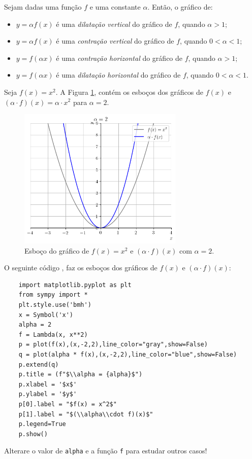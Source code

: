 Sejam dadas uma função $f$ e uma constante $\alpha$. Então, o gráfico de:
\begin{itemize}
\item $y = \alpha f(x)$ é uma \emph{dilatação vertical} do gráfico de $f$, quando $\alpha > 1$;
\item $y = \alpha f(x)$ é uma \emph{contração vertical} do gráfico de $f$, quando $0<\alpha < 1$;
\item $y = f(\alpha x)$ é uma \emph{contração horizontal} do gráfico de $f$, quando $\alpha > 1$;
\item $y = f(\alpha x)$ é uma \emph{dilatação horizontal} do gráfico de $f$, quando $0<\alpha < 1$.
\end{itemize}

\begin{ex}
  Seja $f(x) = x^2$. A Figura \ref{fig:ex_dilavert}, contém os esboços dos gráficos de $f(x)$ e $(\alpha\cdot f)(x) = \alpha \cdot x^2$ para $\alpha = 2$.

  \begin{figure}[H]
    \centering
    \includegraphics[width=0.7\textwidth]{./cap_funcao/dados/fig_ex_dilavert/fig_ex_dilavert}
    \caption{Esboço do gráfico de $f(x) = x^2$ e $(\alpha\cdot f)(x)$ com $\alpha=2$.}
    \label{fig:ex_dilavert}
  \end{figure}

  \ifispython
  O seguinte código {\python}, faz os esboços dos gráficos de $f(x)$ e $(\alpha\cdot f)(x)$:
  \begin{lstlisting}
    import matplotlib.pyplot as plt
    from sympy import *
    plt.style.use('bmh')
    x = Symbol('x')
    alpha = 2
    f = Lambda(x, x**2)
    p = plot(f(x),(x,-2,2),line_color="gray",show=False)
    q = plot(alpha * f(x),(x,-2,2),line_color="blue",show=False)
    p.extend(q)
    p.title = (f"$\\alpha = {alpha}$")
    p.xlabel = '$x$'
    p.ylabel = '$y$'
    p[0].label = "$f(x) = x^2$"
    p[1].label = "$(\\alpha\\cdot f)(x)$"
    p.legend=True
    p.show()    
  \end{lstlisting}
  Alterare o valor de \verb+alpha+ e a função \verb+f+ para estudar outros casos!
  \fi
\end{ex}

